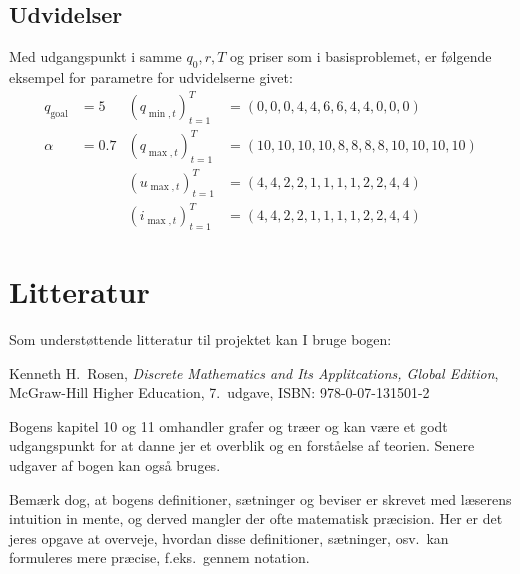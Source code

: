 \documentclass[12pt,oneside,final]{article}
\newcommand{\1}{\mathbbm{1}}
\begin{document}
\subsection{Udvidelser}
Med udgangspunkt i samme \(q_{0}, r, T\) og priser som i basisproblemet, er følgende eksempel for parametre for udvidelserne givet:
\begin{align*}
  q_{\mathrm{goal}} & = 5   & (q_{\min,t})_{t=1}^{T} & = (0, 0, 0, 4, 4, 6, 6, 4, 4, 0, 0, 0)          \\
  \alpha            & = 0.7 & (q_{\max,t})_{t=1}^{T} & = (10, 10, 10, 10, 8, 8, 8, 8, 10, 10, 10, 10)  \\
                    &       & (u_{\max,t})_{t=1}^{T} & = (4, 4, 2, 2, 1, 1, 1, 1, 2, 2, 4, 4)          \\
                    &       & (i_{\max,t})_{t=1}^{T} & = (4, 4, 2, 2, 1, 1, 1, 1, 2, 2, 4, 4)
\end{align*}


\section{Litteratur}
Som understøttende litteratur til projektet kan I bruge bogen:
\begin{center}
  Kenneth H.\ Rosen,
  \emph{Discrete Mathematics and Its Applitcations, Global Edition},\\
  McGraw-Hill Higher Education,
  7.\ udgave,
  ISBN: 978-0-07-131501-2
\end{center}
Bogens kapitel 10 og 11 omhandler grafer og træer og kan være et godt udgangspunkt for at danne jer et overblik og en forståelse af teorien.
Senere udgaver af bogen kan også bruges.

Bemærk dog, at bogens definitioner, sætninger og beviser er skrevet med læserens intuition in mente, og derved mangler der ofte  matematisk præcision.
Her er det jeres opgave at overveje, hvordan disse definitioner, sætninger, osv.\ kan formuleres mere præcise, f.eks.\ gennem notation.
\end{document}
